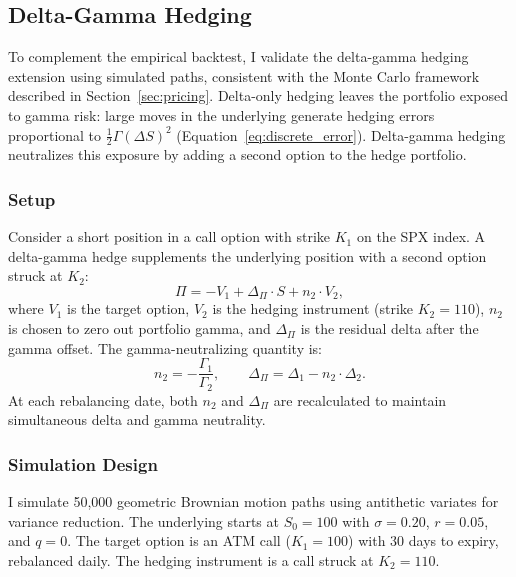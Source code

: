 \documentclass[12pt, letterpaper]{article}
\begin{document}
\subsection{Delta-Gamma Hedging}
\label{sec:delta_gamma}

To complement the empirical backtest, I validate the delta-gamma hedging extension using simulated paths, consistent with the Monte Carlo framework described in Section~\ref{sec:pricing}. Delta-only hedging leaves the portfolio exposed to gamma risk: large moves in the underlying generate hedging errors proportional to $\frac{1}{2}\Gamma(\Delta S)^2$ (Equation~\ref{eq:discrete_error}). Delta-gamma hedging neutralizes this exposure by adding a second option to the hedge portfolio.

\subsubsection{Setup}

Consider a short position in a call option with strike $K_1$ on the SPX index. A delta-gamma hedge supplements the underlying position with a second option struck at $K_2$:
\begin{equation}
    \Pi = -V_1 + \Delta_{\Pi} \cdot S + n_2 \cdot V_2,
    \label{eq:dg_portfolio}
\end{equation}
where $V_1$ is the target option, $V_2$ is the hedging instrument (strike $K_2 = 110$), $n_2$ is chosen to zero out portfolio gamma, and $\Delta_{\Pi}$ is the residual delta after the gamma offset. The gamma-neutralizing quantity is:
\begin{equation}
    n_2 = -\frac{\Gamma_1}{\Gamma_2}, \qquad \Delta_{\Pi} = \Delta_1 - n_2 \cdot \Delta_2.
    \label{eq:gamma_neutral}
\end{equation}
At each rebalancing date, both $n_2$ and $\Delta_{\Pi}$ are recalculated to maintain simultaneous delta and gamma neutrality.

\subsubsection{Simulation Design}

I simulate 50,000 geometric Brownian motion paths using antithetic variates for variance reduction. The underlying starts at $S_0 = 100$ with $\sigma = 0.20$, $r = 0.05$, and $q = 0$. The target option is an ATM call ($K_1 = 100$) with 30 days to expiry, rebalanced daily. The hedging instrument is a call struck at $K_2 = 110$.
\end{document}
